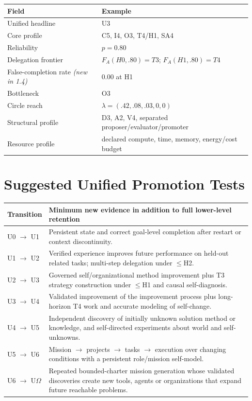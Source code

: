 \documentclass[11pt]{article}
\theoremstyle{definition}
\newcommand{\Om}{\ensuremath{\Omega}}
\begin{document}
\begin{table}[h]
\centering\small
\begin{tabularx}{\textwidth}{@{}lY@{}}
\toprule
Field & Example \\
\midrule
Unified headline & U3 \\
Core profile & C5, I4, O3, T4/H1, SA4 \\
Reliability & $p = 0.80$ \\
Delegation frontier & $F_A(H0,.80)=T3$; $F_A(H1,.80)=T4$ \\
False-completion rate \emph{(new in 1.4)} & 0.00 at H1 \\
Bottleneck & O3 \\
Circle reach & $\lambda = (.42,.08,.03,0,0)$ \\
Structural profile & D3, A2, V4, separated proposer/evaluator/promoter \\
Resource profile & declared compute, time, memory, energy/cost budget \\
\bottomrule
\end{tabularx}
\end{table}

\section{Suggested Unified Promotion Tests}

\begin{table}[h]
\centering\small
\begin{tabularx}{\textwidth}{@{}lY@{}}
\toprule
Transition & Minimum new evidence in addition to full lower-level retention \\
\midrule
U0 $\to$ U1 & Persistent state and correct goal-level completion after restart or context discontinuity. \\
U1 $\to$ U2 & Verified experience improves future performance on held-out related tasks; multi-step delegation under $\le$H2. \\
U2 $\to$ U3 & Governed self/organizational method improvement plus T3 strategy construction under $\le$H1 and causal self-diagnosis. \\
U3 $\to$ U4 & Validated improvement of the improvement process plus long-horizon T4 work and accurate modeling of self-change. \\
U4 $\to$ U5 & Independent discovery of initially unknown solution method or knowledge, and self-directed experiments about world and self-unknowns. \\
U5 $\to$ U6 & Mission $\to$ projects $\to$ tasks $\to$ execution over changing conditions with a persistent role/mission self-model. \\
U6 $\to$ U\Om{} & Repeated bounded-charter mission generation whose validated discoveries create new tools, agents or organizations that expand future reachable problems. \\
\bottomrule
\end{tabularx}
\end{table}
\end{document}
